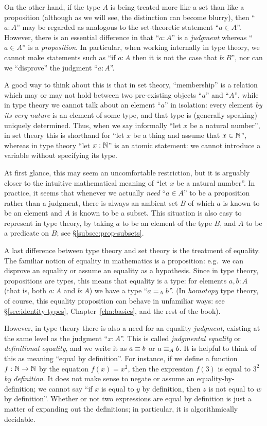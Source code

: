 On the other hand, if the type $A$ is being treated more like a set than like a proposition (although as we will see, the distinction can become blurry), then ``$a:A$'' may be regarded as analogous to the set-theoretic statement ``$a\in A$''.
However, there is an essential difference in that ``$a:A$'' is a \emph{judgment} whereas ``$a\in A$'' is a \emph{proposition}.
In particular, when working internally in type theory, we cannot make statements such as ``if $a:A$ then it is not the case that $b:B$'', nor can we ``disprove'' the judgment ``$a:A$''.

A good way to think about this is that in set theory, ``membership'' is a relation which may or may not hold between two pre-existing objects ``$a$'' and ``$A$'', while in type theory we cannot talk about an element ``$a$'' in isolation: every element \emph{by its very nature} is an element of some type, and that type is (generally speaking) uniquely determined.
Thus, when we say informally ``let $x$ be a natural number'', in set theory this is shorthand for ``let $x$ be a thing and assume that $x\in\nat$'', whereas in type theory ``let $x:\nat$'' is an atomic statement: we cannot introduce a variable without specifying its type.

At first glance, this may seem an uncomfortable restriction, but it is arguably closer to the intuitive mathematical meaning of ``let $x$ be a natural number''.
In practice, it seems that whenever we actually \emph{need} ``$a\in A$'' to be a proposition rather than a judgment, there is always an ambient set $B$ of which $a$ is known to be an element and $A$ is known to be a subset.
This situation is also easy to represent in type theory, by taking $a$ to be an element of the type $B$, and $A$ to be a predicate on $B$; see \S\ref{subsec:prop-subsets}.

A last difference between type theory and set theory is the treatment of equality.
The familiar notion of equality in mathematics is a proposition: e.g.\ we can disprove an equality or assume an equality as a hypothesis.
Since in type theory, propositions are types, this means that equality is a type: for elements $a,b:A$ (that is, both $a:A$ and $b:A$) we have a type ``$\id[A]ab$''.
(In \emph{homotopy} type theory, of course, this equality proposition can behave in unfamiliar ways: see \S\ref{sec:identity-types}, Chapter~\ref{cha:basics}, and the rest of the book).

However, in type theory there is also a need for an equality \emph{judgment}, existing at the same level as the judgment ``$x:A$''.
This is called \emph{judgmental equality} or \emph{definitional equality}, and we write it as $a\jdeq b$ or $a \jdeq_A b$.
It is helpful to think of this as meaning ``equal by definition''.
For instance, if we define a function $f:\nat\to\nat$ by the equation $f(x)=x^2$, then the expression $f(3)$ is equal to $3^2$ \emph{by definition}.
It does not make sense to negate or assume an equality-by-definition; we cannot say ``if $x$ is equal to $y$ by definition, then $z$ is not equal to $w$ by definition''.
Whether or not two expressions are equal by definition is just a matter of expanding out the definitions; in particular, it is algorithmically decidable.

